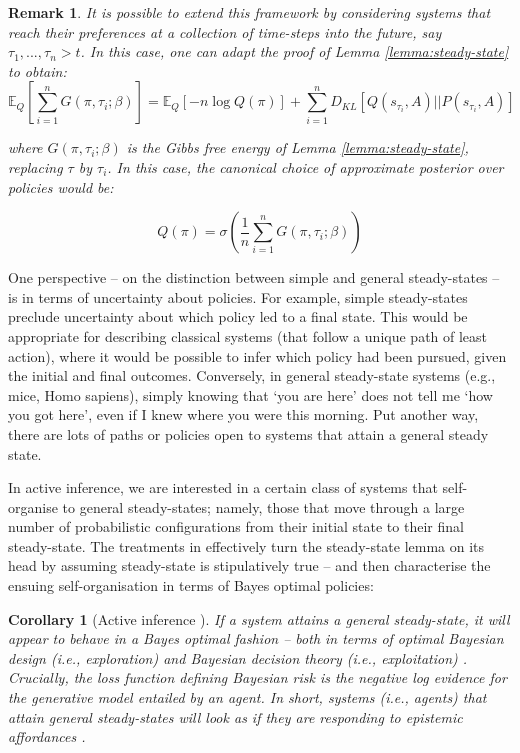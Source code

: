 \documentclass[review,12pt,authoryear]{elsarticle}
\newcommand{\E}{\mathbb E}
\newtheorem{corollary}[theorem]{Corollary}
\newtheorem{remark}[theorem]{Remark}
\begin{document}
\begin{remark}
It is possible to extend this framework by considering systems that reach their preferences at a collection of time-steps into the future, say $\tau_1,...,\tau_n >t$. In this case, one can adapt the proof of Lemma \ref{lemma:steady-state} to obtain:
\begin{equation}
    \E_Q \left[\sum_{i =1}^n G(\pi, \tau_i; \beta)\right ]= \E_Q[-n \log Q(\pi)]+ \sum_{i =1}^n D_{KL}[Q(s_{\tau_i},A)||P(s_{\tau_i}, A)]
\end{equation}

where $G(\pi, \tau_i; \beta)$ is the Gibbs free energy of Lemma \ref{lemma:steady-state}, replacing $\tau$ by $\tau_i$. In this case, the canonical choice of approximate posterior over policies would be:

\begin{equation}
    Q(\pi)= \sigma \left(\frac 1 n \sum_{i =1}^n G(\pi, \tau_i; \beta)\right)
\end{equation}

\end{remark}

One perspective – on the distinction between simple and general steady-states – is in terms of uncertainty about policies. For example, simple steady-states preclude uncertainty about which policy led to a final state. This would be appropriate for describing classical systems (that follow a unique path of least action), where it would be possible to infer which policy had been pursued, given the initial and final outcomes. Conversely, in general steady-state systems (e.g., mice, Homo sapiens), simply knowing that ‘you are here’ does not tell me ‘how you got here’, even if I knew where you were this morning. Put another way, there are lots of paths or policies open to systems that attain a general steady state.

In active inference, we are interested in a certain class of systems that self-organise to general steady-states; namely, those that move through a large number of probabilistic configurations from their initial state to their final steady-state. The treatments in \citep{parrMarkovBlanketsInformation2019,fristonFreeEnergyPrinciple2019} effectively turn the steady-state lemma on its head by assuming steady-state is stipulatively true – and then characterise the ensuing self-organisation in terms of Bayes optimal policies:

\begin{corollary}[Active inference \citep{fristonFreeEnergyPrinciple2019}]
If a system attains a general steady-state, it will appear to behave in a Bayes optimal fashion – both in terms of optimal Bayesian design (i.e., exploration) and Bayesian decision theory (i.e., exploitation) \citep{fristonSophisticatedInference2020}. Crucially, the loss function defining Bayesian risk is the negative log evidence for the generative model entailed by an agent. In short, systems (i.e., agents) that attain general steady-states will look as if they are responding to epistemic affordances \citep{parrWorkingMemoryAttention2017}.
\end{corollary}
\end{document}
